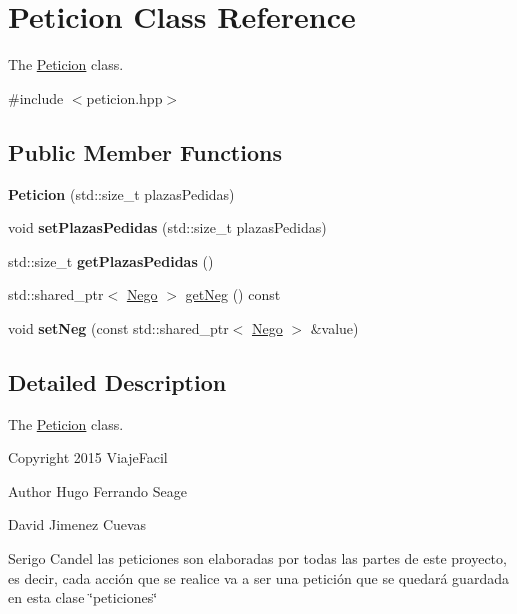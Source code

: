 \hypertarget{classPeticion}{}\section{Peticion Class Reference}
\label{classPeticion}


The \hyperlink{classPeticion}{Peticion} class.  




{\ttfamily \#include $<$peticion.\+hpp$>$}

\subsection*{Public Member Functions}
\begin{DoxyCompactItemize}
\item 
\hypertarget{classPeticion_adca26c8f1c41bc14c69cad5ac7713e3c}{}{\bfseries Peticion} (std\+::size\+\_\+t plazas\+Pedidas)\label{classPeticion_adca26c8f1c41bc14c69cad5ac7713e3c}

\item 
\hypertarget{classPeticion_a75bbeae7cedba0b5c32993f1f3f9c7e1}{}void {\bfseries set\+Plazas\+Pedidas} (std\+::size\+\_\+t plazas\+Pedidas)\label{classPeticion_a75bbeae7cedba0b5c32993f1f3f9c7e1}

\item 
\hypertarget{classPeticion_a58a129027db952f86676a721c7acc6c4}{}std\+::size\+\_\+t {\bfseries get\+Plazas\+Pedidas} ()\label{classPeticion_a58a129027db952f86676a721c7acc6c4}

\item 
std\+::shared\+\_\+ptr$<$ \hyperlink{classNego}{Nego} $>$ \hyperlink{classPeticion_a09a935e534f00ff9d3fb11cfd810e189}{get\+Neg} () const 
\item 
\hypertarget{classPeticion_a58b976cd1ce63f7c9602b5940872c4b7}{}void {\bfseries set\+Neg} (const std\+::shared\+\_\+ptr$<$ \hyperlink{classNego}{Nego} $>$ \&value)\label{classPeticion_a58b976cd1ce63f7c9602b5940872c4b7}

\end{DoxyCompactItemize}


\subsection{Detailed Description}
The \hyperlink{classPeticion}{Peticion} class. 

Copyright 2015 Viaje\+Facil \begin{DoxyAuthor}{Author}
Hugo Ferrando Seage 

David Jimenez Cuevas 

Serigo Candel las peticiones son elaboradas por todas las partes de este proyecto, es decir, cada acción que se realice va a ser una petición que se quedará guardada en esta clase \char`\"{}peticiones\char`\"{} 
\end{DoxyAuthor}


